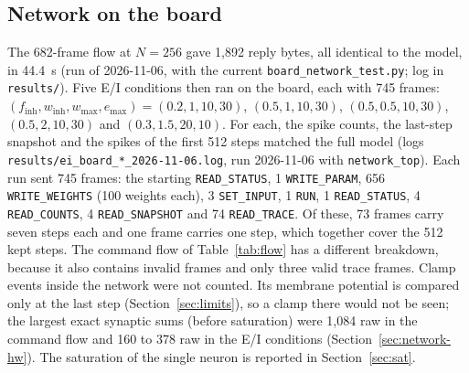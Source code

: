 \documentclass[11pt]{article}
\begin{document}
\subsection{Network on the board}
The 682-frame flow at $N=256$ gave 1,892 reply bytes, all identical to the model, in 44.4~s (run of 2026-11-06, with the current \texttt{board\_network\_test.py}; log in \texttt{results/}).
Five E/I conditions then ran on the board, each with 745 frames: $(f_{\mathrm{inh}}, w_{\mathrm{inh}}, w_{\max}, e_{\max}) = (0.2, 1, 10, 30)$, $(0.5, 1, 10, 30)$, $(0.5, 0.5, 10, 30)$, $(0.5, 2, 10, 30)$ and $(0.3, 1.5, 20, 10)$.
For each, the spike counts, the last-step snapshot and the spikes of the first 512 steps matched the full model (logs \texttt{results/\allowbreak ei\_board\allowbreak\_*\allowbreak\_2026-11-06.log}, run 2026-11-06 with \texttt{network\_top}).
Each run sent 745 frames: the starting \texttt{READ\_STATUS}, 1 \texttt{WRITE\_PARAM}, 656 \texttt{WRITE\_WEIGHTS} (100 weights each), 3 \texttt{SET\_INPUT}, 1 \texttt{RUN}, 1 \texttt{READ\_STATUS}, 4 \texttt{READ\_COUNTS}, 4 \texttt{READ\_SNAPSHOT} and 74 \texttt{READ\_TRACE}. Of these, 73 frames carry seven steps each and one frame carries one step, which together cover the 512 kept steps. The command flow of Table~\ref{tab:flow} has a different breakdown, because it also contains invalid frames and only three valid trace frames.
Clamp events inside the network were not counted. Its membrane potential is compared only at the last step (Section~\ref{sec:limits}), so a clamp there would not be seen; the largest exact synaptic sums (before saturation) were 1,084 raw in the command flow and 160 to 378 raw in the E/I conditions (Section~\ref{sec:network-hw}). The saturation of the single neuron is reported in Section~\ref{sec:sat}.
\end{document}
